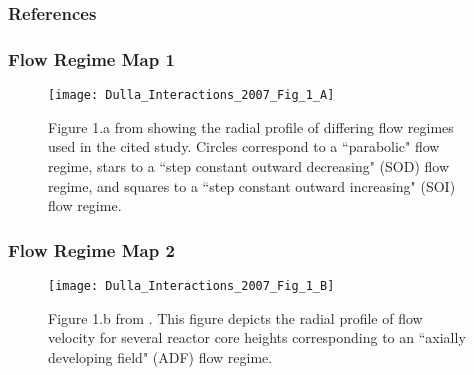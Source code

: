 \documentclass{beamer}
\begin{document}
\begin{frame}[allowframebreaks]
\frametitle{References}



\end{frame}

\begin{frame}
\frametitle{Flow Regime Map 1}

\begin{figure}[H]
   \centering
   \texttt{[image: Dulla\_Interactions\_2007\_Fig\_1\_A]}
   \caption{Figure 1.a from \cite{dulla_interactions_2007} showing the radial profile of
   differing flow regimes used in the cited study. Circles correspond
    to a ``parabolic" flow regime, stars to a ``step constant outward
     decreasing"
    (SOD) flow regime, and squares to a ``step constant outward increasing"
     (SOI)
    flow regime.} 
   \label{fig:dulla_flow_map}
\end{figure}

\end{frame}

\begin{frame}
\frametitle{Flow Regime Map 2}

\begin{figure}[H]
   \centering
   \texttt{[image: Dulla\_Interactions\_2007\_Fig\_1\_B]}
   \caption{Figure 1.b from \cite{dulla_interactions_2007}.
   This figure depicts
   the radial profile of flow velocity for several reactor core heights
   corresponding to an ``axially developing field" (ADF) flow regime.} 
   \label{fig:dulla_flow_adf}
\end{figure}

\end{frame}
\end{document}
